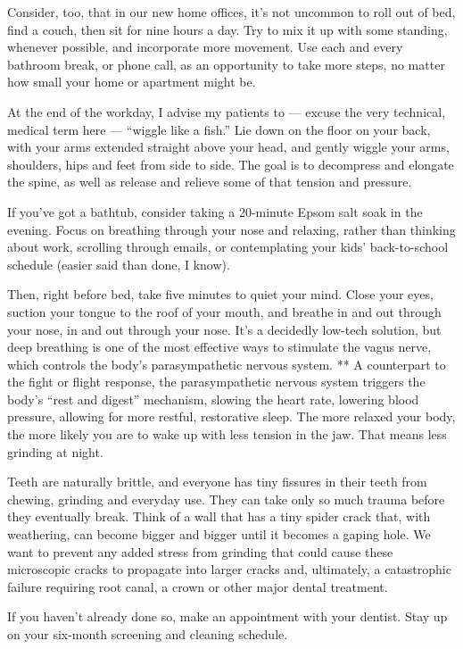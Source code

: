 Consider, too, that in our new home offices, it's not uncommon to roll
out of bed, find a couch, then sit for nine hours a day. Try to mix it
up with some standing, whenever possible, and incorporate more movement.
Use each and every bathroom break, or phone call, as an opportunity to
take more steps, no matter how small your home or apartment might be.

At the end of the workday, I advise my patients to --- excuse the very
technical, medical term here --- ``wiggle like a fish.'' Lie down on the
floor on your back, with your arms extended straight above your head,
and gently wiggle your arms, shoulders, hips and feet from side to side.
The goal is to decompress and elongate the spine, as well as release and
relieve some of that tension and pressure.

If you've got a bathtub, consider taking a 20-minute Epsom salt soak in
the evening. Focus on breathing through your nose and relaxing, rather
than thinking about work, scrolling through emails, or contemplating
your kids' back-to-school schedule (easier said than done, I know).

Then, right before bed, take five minutes to quiet your mind. Close your
eyes, suction your tongue to the roof of your mouth, and breathe in and
out through your nose, in and out through your nose. It's a decidedly
low-tech solution, but deep breathing is one of the most effective ways
to stimulate the vagus nerve, which controls the body's parasympathetic
nervous system. ** A counterpart to the fight or flight response, the
parasympathetic nervous system triggers the body's ``rest and digest''
mechanism, slowing the heart rate, lowering blood pressure, allowing for
more restful, restorative sleep. The more relaxed your body, the more
likely you are to wake up with less tension in the jaw. That means less
grinding at night.

Teeth are naturally brittle, and everyone has tiny fissures in their
teeth from chewing, grinding and everyday use. They can take only so
much trauma before they eventually break. Think of a wall that has a
tiny spider crack that, with weathering, can become bigger and bigger
until it becomes a gaping hole. We want to prevent any added stress from
grinding that could cause these microscopic cracks to propagate into
larger cracks and, ultimately, a catastrophic failure requiring root
canal, a crown or other major dental treatment.

If you haven't already done so, make an appointment with your dentist.
Stay up on your six-month screening and cleaning schedule.

